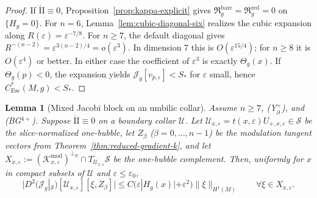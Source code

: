 \documentclass[11pt,reqno,a4paper]{amsart}
\numberwithin{equation}{section}
\theoremstyle{plain}
\newtheorem{lemma}[theorem]{Lemma}
\newcommand{\Esc}{\ensuremath{\mathrm{Esc}}}
\theoremstyle{remark}
\theoremstyle{plain}
\begin{document}
\begin{proof}
If $\mathring{\mathrm{II}}\equiv0$, Proposition~\ref{prop:kappa-explicit} gives
$\mathfrak R_g^{\mathrm{bare}}=\mathfrak R_g^{\mathrm{red}}=0$ on $\{H_g=0\}$.
For $n=6$, Lemma~\ref{lem:cubic-diagonal-six} realizes the cubic expansion
along $R(\varepsilon)=\varepsilon^{-7/8}$.  For $n\ge7$, the default diagonal
gives $R^{-(n-2)}=\varepsilon^{3(n-2)/4}=o(\varepsilon^3)$.
In dimension $7$ this is $O(\varepsilon^{15/4})$; for $n\ge8$ it is
$O(\varepsilon^4)$ or better.  In either case the coefficient of $\varepsilon^3$
is exactly $\Theta_g(x)$.
If $\Theta_g(p)<0$, the expansion yields
$\mathcal J_g[v_{p,\varepsilon}]<S_\ast$ for $\varepsilon$ small,
hence $C_{\Esc}^*(M,g)<S_\ast$.
\end{proof}

\begin{lemma}[Mixed Jacobi block on an umbilic collar]\label{lem:mixed-jacobi-umbilic}
Assume $n\ge7$, \textup{(Y$^+_{\partial}$)}, and \textup{(BG$^{4+}$)}.
Suppose $\mathring{\mathrm{II}}\equiv0$ on a boundary collar $\mathcal U$.
Let $\mathcal U_{x,\varepsilon}=t(x,\varepsilon)U_{+,x,\varepsilon}\in\mathcal S$ be the
slice-normalized one-bubble, let $Z_\beta$ ($\beta=0,\dots,n-1$) be the modulation
tangent vectors from Theorem~\ref{thm:reduced-gradient-k}, and let
$X_{x,\varepsilon}:=(\mathcal K^{\mathrm{mod}}_{x,\varepsilon})^{\perp_E}\cap T_{\mathcal U_{x,\varepsilon}}\mathcal S$
be the one-bubble complement.
Then, uniformly for $x$ in compact subsets of $\mathcal U$ and $\varepsilon\le\varepsilon_0$,
\begin{equation}\label{eq:mixed-jacobi-umbilic}
\big|D^2(\mathcal J_g|_{\mathcal S})[\mathcal U_{x,\varepsilon}][\xi,Z_\beta]\big|
\le C\bigl(\varepsilon|H_g(x)|+\varepsilon^2\bigr)\|\xi\|_{H^1(M)}
\qquad\forall\xi\in X_{x,\varepsilon}.
\end{equation}
\end{lemma}
\end{document}
